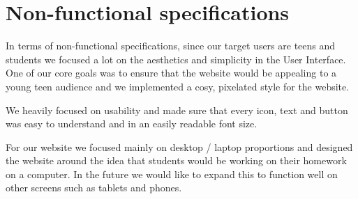 \section{Non-functional specifications}
\label{sect:non-functional-specifications}

In terms of non-functional specifications, since our target users are teens and students we focused a lot on the aesthetics and simplicity in the User Interface. One of our core goals was to ensure that the website would be appealing to a young teen audience and we implemented a cosy, pixelated style for the website.

We heavily focused on usability and made sure that every icon, text and button was easy to understand and in an easily readable font size.

For our website we focused mainly on desktop / laptop proportions and designed the website around the idea that students would be working on their homework on a computer. In the future we would like to expand this to function well on other screens such as tablets and phones.

